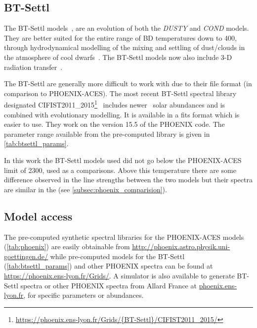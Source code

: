 \subsection{BT-Settl}
\label{subsec:btsettl}
The {BT-Settl} models~\citep{allard_models_2012,allard_atmospheres_2012,rajpurohit_effective_2013,baraffe_new_2015}, are an evolution of both the \emph{DUSTY} and \emph{COND} models.
They are better suited for the entire range of {BD} temperatures down to 400\K{}, through hydrodynamical modelling of the mixing and settling of dust/clouds in the atmosphere of cool dwarfs~\citep{freytag_role_2010}.
The {BT-Settl} models now also include 3-D radiation transfer~\citep{seelmann_3d_2010}.

The {BT-Settl} are generally more difficult to work with due to their file format (in comparison to {PHOENIX-ACES}).
The most recent {BT-Settl} spectral library designated {CIFIST2011\_2015}\footnote{\url{https://phoenix.ens-lyon.fr/Grids/{BT-Settl}/CIFIST2011_2015/}}~\citep{baraffe_new_2015} includes newer~\citet{caffau_solar_2011} solar abundances and is combined with evolutionary modelling.
It is available in a fits format which is easier to use.
They work on the version 15.5 of the {PHOENIX} code.
The parameter range available from the pre-computed library is given in \cref{tab:btsettl_params}.



In this work the {BT-Settl} models used did not go below the {PHOENIX-ACES} limit of 2300\K{}, used as a comparisons.
Above this temperature there are some difference observed in the line strengths between the two models but their spectra are similar in the \nir{} (see \cref{subsec:phoenix_comparision}).


\subsection{Model access}
\label{subsec:model_access}
The pre-computed synthetic spectral libraries for the {PHOENIX-ACES} models (\cref{tab:phoenix}) are easily obtainable from \href{http://phoenix.astro.physik.uni-goettingen.de/}{http://phoenix.astro.physik.uni-goettingen.de/} while pre-computed models for the {BT-Settl} (\cref{tab:btsettl_params}) and other {PHOENIX} spectra can be found at \href{https://phoenix.ens-lyon.fr/Grids/}{https://phoenix.ens-lyon.fr/Grids/}.
A simulator is also available to generate {BT-Settl} spectra or other {PHOENIX} spectra from {Allard France} at \href{phoenix.ens-lyon.fr}{phoenix.ens-lyon.fr}, for specific parameters or abundances.

